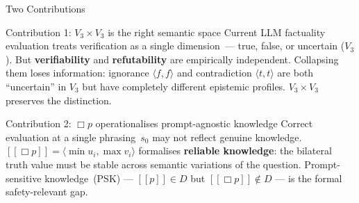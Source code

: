 \documentclass[aspectratio=169,9pt]{beamer}
\newcommand{\tv}[2]{\langle #1,#2 \rangle}
\newcommand{\semp}{[\![p]\!]}
\begin{document}
\begin{frame}{Two Contributions}

  \begin{block}{Contribution 1: $V_3 \times V_3$ is the right semantic space}
    Current LLM factuality evaluation treats verification as a single dimension~---
    true, false, or uncertain ($V_3$).
    But \textbf{verifiability} and \textbf{refutability} are empirically independent.
    Collapsing them loses information: ignorance $\tv{f}{f}$ and contradiction
    $\tv{t}{t}$ are both ``uncertain'' in $V_3$ but have completely different
    epistemic profiles.  $V_3{\times}V_3$ preserves the distinction.
  \end{block}

  \bigskip

  \begin{block}{Contribution 2: $\Box p$ operationalises prompt-agnostic knowledge}
    Correct evaluation at a single phrasing~$s_0$ may not reflect genuine knowledge.
    $[\![\Box p]\!] = \langle\min u_i,\max v_i\rangle$ formalises
    \textbf{reliable knowledge}: the bilateral truth value must be stable across
    semantic variations of the question.
    Prompt-sensitive knowledge~(PSK) --- $\semp \in D$ but $[\![\Box p]\!]\notin D$
    --- is the formal safety-relevant gap.
  \end{block}

\end{frame}
\end{document}
